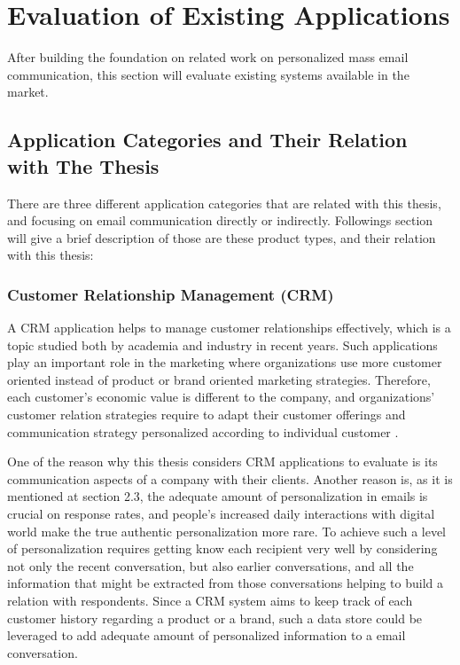 \chapter{Evaluation of Existing Applications}
\label{chp:3:EvalExisAppl}
After building the foundation on related work on personalized mass email communication, this section will evaluate existing systems available in the market. 

\section{Application Categories and Their Relation with The Thesis}
\label{sec:3.1:SystCate}

There are three different application categories that are related with this thesis, and focusing on email communication directly or indirectly. Followings section will give a brief description of those are these product types, and their relation with this thesis:

\subsection{Customer Relationship Management (CRM)}
\label{subsec:3.1.1:Cust}
A \ac{CRM} application helps to manage customer relationships effectively, which is a topic studied both by academia and industry in recent years. Such applications play an important role in the marketing where organizations use more customer oriented instead of product or brand oriented marketing strategies. Therefore, each customer's economic value is different to the company, and organizations' customer relation strategies require to adapt their customer offerings and communication strategy personalized according to individual customer \citep{Reinartz2004}. 
\vspace{1cm}

One of the reason why this thesis considers \ac{CRM} applications to evaluate is its communication aspects of a company with their clients. Another reason is, as it is mentioned at section 2.3, the adequate amount of personalization in emails is crucial on response rates, and people's increased daily interactions with digital world make the true authentic personalization more rare. To achieve such a level of personalization requires getting know each recipient very well by considering not only the recent conversation, but also earlier conversations, and all the information that might be extracted from those conversations helping to build a relation with respondents. Since a \ac{CRM} system aims to keep track of each customer history regarding a product or a brand, such a data store could be leveraged to add adequate amount of personalized information to a email conversation. 

